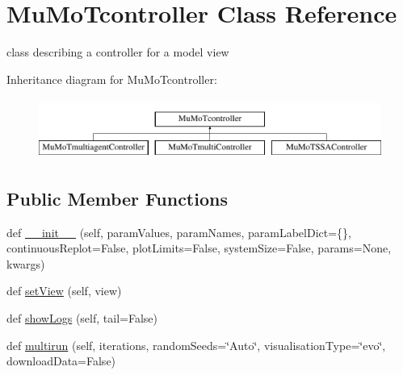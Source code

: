 \hypertarget{class_mu_mo_t_1_1_mu_mo_t_1_1_mu_mo_tcontroller}{}\section{Mu\+Mo\+Tcontroller Class Reference}
\label{class_mu_mo_t_1_1_mu_mo_t_1_1_mu_mo_tcontroller}


class describing a controller for a model view  


Inheritance diagram for Mu\+Mo\+Tcontroller\+:\begin{figure}[H]
\begin{center}
\leavevmode
\includegraphics[height=2.000000cm]{class_mu_mo_t_1_1_mu_mo_t_1_1_mu_mo_tcontroller}
\end{center}
\end{figure}
\subsection*{Public Member Functions}
\begin{DoxyCompactItemize}
\item 
def \hyperlink{class_mu_mo_t_1_1_mu_mo_t_1_1_mu_mo_tcontroller_a2b7e9681302740635162f2f8f0dddebf}{\+\_\+\+\_\+init\+\_\+\+\_\+} (self, param\+Values, param\+Names, param\+Label\+Dict=\{\}, continuous\+Replot=False, plot\+Limits=False, system\+Size=False, params=None, kwargs)
\item 
def \hyperlink{class_mu_mo_t_1_1_mu_mo_t_1_1_mu_mo_tcontroller_a40e22e664ecb6e379377ee1cea60073c}{set\+View} (self, view)
\item 
def \hyperlink{class_mu_mo_t_1_1_mu_mo_t_1_1_mu_mo_tcontroller_a64ca78b9bf9f0f3150077ab79405a674}{show\+Logs} (self, tail=False)
\item 
def \hyperlink{class_mu_mo_t_1_1_mu_mo_t_1_1_mu_mo_tcontroller_a1ce217feec26521a4854a69da8fddc98}{multirun} (self, iterations, random\+Seeds=\char`\"{}Auto\char`\"{}, visualisation\+Type=\char`\"{}evo\char`\"{}, download\+Data=False)
\end{DoxyCompactItemize}
